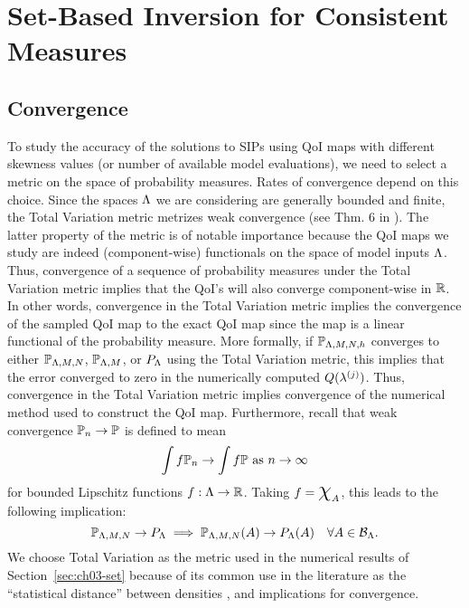 

\section{Set-Based Inversion for Consistent Measures}\label{sec:set-based}








\subsection{Convergence}
To study the accuracy of the solutions to SIPs using QoI maps with different skewness values (or number of available model evaluations), we need to select a metric on the space of probability measures.
Rates of convergence depend on this choice.
Since the spaces ${\Lambda}$ we are considering are generally bounded and finite, the Total Variation metric metrizes weak convergence (see Thm. 6 in \cite{GS02}).
The latter property of the metric is of notable importance because the QoI maps we study are indeed (component-wise) functionals on the space of model inputs ${\Lambda}$.
Thus, convergence of a sequence of probability measures under the Total Variation metric implies that the QoI's will also converge component-wise in $\mathbb{R}$.
In other words, convergence in the Total Variation metric implies the convergence of the sampled QoI map to the exact QoI map since the map is a linear functional of the probability measure.
More formally, if $\mathbb{P}_{{\Lambda},M,N,h}$ converges to either $\mathbb{P}_{{\Lambda},M,N}$, $\mathbb{P}_{{\Lambda},M}$, or $P_{\Lambda}$ using the Total Variation metric, this implies that the error converged to zero in the numerically computed $Q(\lambda^{(j)})$.
Thus, convergence in the Total Variation metric implies convergence of the numerical method used to construct the QoI map.
Furthermore, recall that weak convergence $\mathbb{P}_n \to \mathbb{P}$ is defined to mean
\[
\int f \mathbb{P}_n \to \int f \mathbb{P} \text{ as } n \to \infty
\]
for bounded Lipschitz functions $f:{\Lambda}\to\mathbb{R}$.
Taking $f = \Chi_A$, this leads to the following implication:
\[
\mathbb{P}_{{\Lambda}, M, N} \to P_{\Lambda} \implies \mathbb{P}_{{\Lambda}, M, N} (A) \to P_{\Lambda} (A) \quad \forall{A\in\mathcal{B}_{{\Lambda}}}.
\]
We choose Total Variation as the metric used in the numerical results of Section~\ref{sec:ch03-set} because of its common use in the literature as the ``statistical distance'' between densities \cite{GS02, Silverman}, and implications for convergence.


